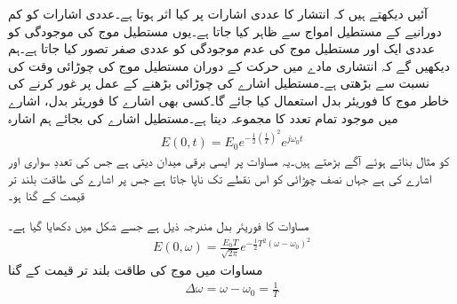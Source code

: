 آئیں دیکھتے ہیں کہ انتشار کا عددی اشارات پر کیا اثر ہوتا ہے۔عددی اشارات کو کم دورانیے کے مستطیل امواج سے ظاہر کیا جاتا ہے۔یوں مستطیل موج کی موجودگی کو عددی ایک  اور مستطیل موج کی عدم موجودگی کو عددی صفر  تصور کیا جاتا ہے۔ہم دیکھیں گے کہ انتشاری مادے میں حرکت کے دوران مستطیل موج کی چوڑائی وقت کی نسبت سے بڑھتی ہے۔مستطیل اشارے کی چوڑائی بڑھنے کے عمل پر غور کرنے کی خاطر موج کا فوریئر بدل استعمال کیا جائے گا۔کسی بھی اشارے کا فوریئر بدل، اشارے میں موجود تمام تعدد کا مجموعہ دیتا ہے۔مستطیل اشارے کی بجائے ہم  اشارہ
\begin{align}\label{مساوات_ترچھی_انتشار_گاوسی_اشارہ}
E(0,t)=E_0 e^{-\tfrac{1}{2} \left(\tfrac{t}{T}\right)^2} e^{j \omega_0 t}
\end{align}
 کو مثال بناتے ہوئے آگے بڑھتے ہیں۔یہ مساوات  پر ایسی برقی میدان دیتی ہے جس کی تعددِ سواری   اور  اشارے کی    ہے  جہاں  نصف چوڑائی  کو اس نقطے تک ناپا جاتا ہے جس پر اشارے کی طاقت بلند تر قیمت کے   گنا ہو۔


مساوات  کا فوریئر بدل مندرجہ ذیل ہے جسے شکل  میں دکھایا گیا ہے۔
\begin{align}\label{مساوات_ترچھی_انتشار_گاوسی_فوریئر_بدل}
E(0,\omega)=\frac{E_0 T}{\sqrt{2\pi}} e^{-\tfrac{1}{2} T^2 (\omega-\omega_0)^2}
\end{align}
مساوات  میں موج کی طاقت بلند تر قیمت کے  گنا 
\begin{align}\label{مساوات_ترچھی_انتشار_نصف_چوڑائی}
\Delta \omega=\omega-\omega_0=\frac{1}{T}
\end{align}

